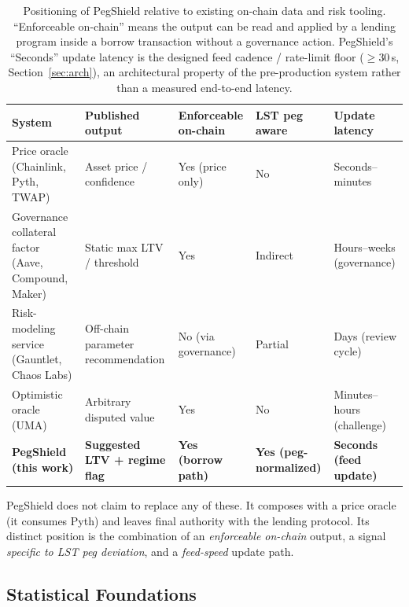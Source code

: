 \documentclass[aps,prx,reprint,nofootinbib,longbibliography]{revtex4-2}
\begin{document}
\begin{table}[t]
\caption{\label{tab:positioning}Positioning of PegShield relative to existing
on-chain data and risk tooling. ``Enforceable on-chain'' means the output can be
read and applied by a lending program inside a borrow transaction without a
governance action. PegShield's ``Seconds'' update latency is the designed feed
cadence / rate-limit floor ($\geq 30$\,s, Section~\ref{sec:arch}), an architectural
property of the pre-production system rather than a measured end-to-end latency.}
\begin{tabular}{p{3.2cm}p{4.3cm}p{2.6cm}p{2.2cm}p{3.0cm}}
\toprule
System & Published output & Enforceable on-chain & LST peg aware & Update latency \\
\midrule
Price oracle (Chainlink, Pyth, TWAP)
  & Asset price / confidence
  & Yes (price only)
  & No
  & Seconds--minutes \\
Governance collateral factor (Aave, Compound, Maker)
  & Static max LTV / threshold
  & Yes
  & Indirect
  & Hours--weeks (governance) \\
Risk-modeling service (Gauntlet, Chaos Labs)
  & Off-chain parameter recommendation
  & No (via governance)
  & Partial
  & Days (review cycle) \\
Optimistic oracle (UMA)
  & Arbitrary disputed value
  & Yes
  & No
  & Minutes--hours (challenge) \\
\textbf{PegShield (this work)}
  & \textbf{Suggested LTV + regime flag}
  & \textbf{Yes (borrow path)}
  & \textbf{Yes (peg-normalized)}
  & \textbf{Seconds (feed update)} \\
\bottomrule
\end{tabular}
\end{table}

PegShield does not claim to replace any of these. It composes with a price oracle
(it consumes Pyth) and leaves final authority with the lending protocol. Its
distinct position is the combination of an \emph{enforceable on-chain} output, a
signal \emph{specific to LST peg deviation}, and a \emph{feed-speed} update path.

\subsection{Statistical Foundations}
\end{document}

